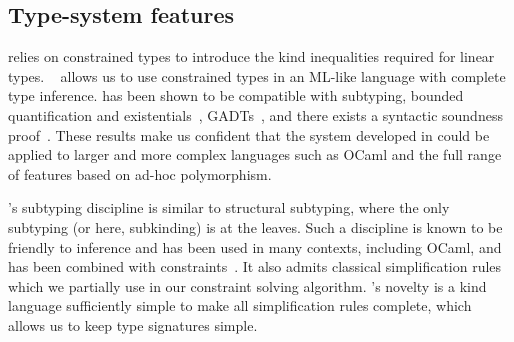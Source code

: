 \subsection{Type-system features}
%
\lang relies on constrained types
to introduce the kind inequalities required for linear types.
\hmx~\citep{DBLP:journals/tapos/OderskySW99} 
allows us to use constrained types in an ML-like language with complete
type inference.
\hmx has been shown to be compatible with subtyping,
bounded quantification and existentials~\citep{DBLP:conf/icfp/Simonet03},
GADTs~\citep{DBLP:journals/toplas/SimonetP07},
and there exists a syntactic soundness proof~\citep{DBLP:journals/entcs/SkalkaP02}.
These results make us confident that the system developed in \lang
could be applied to larger and more complex languages such as OCaml
and the full range of features based on ad-hoc polymorphism.

\lang's  subtyping discipline is similar
to structural subtyping, where the only subtyping (or here, subkinding)
is at the leaves.
Such a discipline is known to be friendly to inference and has been used in many
contexts, including OCaml, and has been combined
with constraints~\citep{DBLP:journals/tapos/OderskySW99,DBLP:conf/sas/TrifonovS96}.
It also admits classical simplification rules
\citep{DBLP:conf/aplas/Simonet03,DBLP:conf/popl/PottierS02} which we partially use
in our constraint solving algorithm.
\affe's novelty is a kind language
sufficiently simple to make
all simplification rules complete, which allows us to keep type signatures simple.


